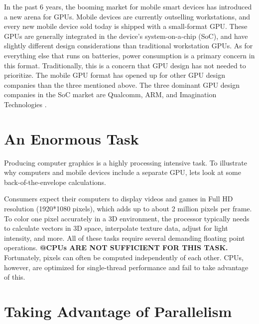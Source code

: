 \documentclass[../main/report.tex]{subfiles}
\begin{document}
In the past 6 years, the booming market for mobile smart devices has introduced a new arena for GPUs.
Mobile devices are currently outselling workstations, and every new mobile device sold today is shipped with a small-format GPU.
These GPUs are generally integrated in the device's system-on-a-chip (SoC), and have slightly different design considerations than traditional workstation GPUs.
As for everything else that runs on batteries, power consumption is a primary concern in this format.
Traditionally, this is a concern that GPU design has not needed to prioritize.
The mobile GPU format has opened up for other GPU design companies than the three mentioned above.
The three dominant GPU design companies in the SoC market are Qualcomm, ARM, and Imagination Technologies \cite{gpu_mobile_sales}.


\section{An Enormous Task}

Producing computer graphics is a highly processing intensive task.
To illustrate why computers and mobile devices include a separate GPU, lets look at some back-of-the-envelope calculations.

Consumers expect their computers to display videos and games in Full HD resolution (1920*1080 pixels), which adds up to about 2 million pixels per frame.
To color one pixel accurately in a 3D environment, the processor typically needs to calculate vectors in 3D space, interpolate texture data, adjust for light intensity, and more.
All of these tasks require several demanding floating point operations.
\textbf{@CPUs ARE NOT SUFFICIENT FOR THIS TASK.}
Fortunately, pixels can often be computed independently of each other.
CPUs, however, are optimized for single-thread performance and fail to take advantage of this.

\section{Taking Advantage of Parallelism}
\end{document}
